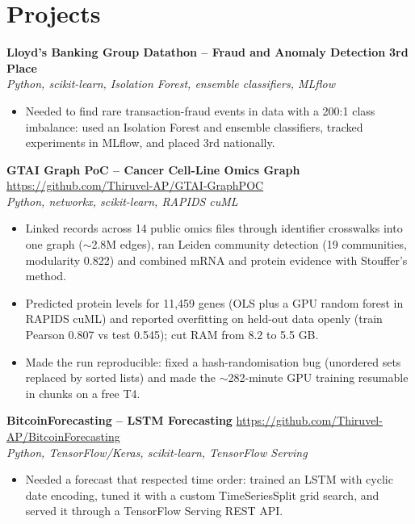 \documentclass[a4paper,11pt]{article}
\begin{document}
\section{Projects}
\vspace{2pt}

\noindent\textbf{Lloyd's Banking Group Datathon -- Fraud and Anomaly Detection}
\hfill \textbf{3rd Place}
\\
\textit{Python, scikit-learn, Isolation Forest, ensemble classifiers, MLflow}
\begin{itemize}
    \item Needed to find rare transaction-fraud events in data with a 200:1 class imbalance: used an Isolation Forest and ensemble classifiers, tracked experiments in MLflow, and placed 3rd nationally.
\end{itemize}

\vspace{6pt}

\noindent\textbf{GTAI Graph PoC -- Cancer Cell-Line Omics Graph}
\hfill \url{https://github.com/Thiruvel-AP/GTAI-GraphPOC}
\\
\textit{Python, networkx, scikit-learn, RAPIDS cuML}
\begin{itemize}
    \item Linked records across 14 public omics files through identifier crosswalks into one graph ($\sim$2.8M edges), ran Leiden community detection (19 communities, modularity 0.822) and combined mRNA and protein evidence with Stouffer's method.
    \item Predicted protein levels for 11,459 genes (OLS plus a GPU random forest in RAPIDS cuML) and reported overfitting on held-out data openly (train Pearson 0.807 vs test 0.545); cut RAM from 8.2 to 5.5 GB.
    \item Made the run reproducible: fixed a hash-randomisation bug (unordered sets replaced by sorted lists) and made the $\sim$282-minute GPU training resumable in chunks on a free T4.
\end{itemize}

\vspace{6pt}

\noindent\textbf{BitcoinForecasting -- LSTM Forecasting}
\hfill \url{https://github.com/Thiruvel-AP/BitcoinForecasting}
\\
\textit{Python, TensorFlow/Keras, scikit-learn, TensorFlow Serving}
\begin{itemize}
    \item Needed a forecast that respected time order: trained an LSTM with cyclic date encoding, tuned it with a custom TimeSeriesSplit grid search, and served it through a TensorFlow Serving REST API.
\end{itemize}
\end{document}
